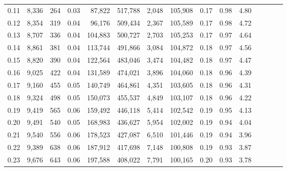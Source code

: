 \begin{tabular}{rrrcrrrrrrrrrrr}
0.11 &   8,336 &    264 &                                       0.03 &   87,822 &  517,788 &    2,048 &  105,908 &  0.17 &  0.98 &                         4.80 \\
0.12 &   8,354 &    319 &                                       0.04 &   96,176 &  509,434 &    2,367 &  105,589 &  0.17 &  0.98 &                         4.72 \\
0.13 &   8,707 &    336 &                                       0.04 &  104,883 &  500,727 &    2,703 &  105,253 &  0.17 &  0.97 &                         4.64 \\
0.14 &   8,861 &    381 &                                       0.04 &  113,744 &  491,866 &    3,084 &  104,872 &  0.18 &  0.97 &                         4.56 \\
0.15 &   8,820 &    390 &                                       0.04 &  122,564 &  483,046 &    3,474 &  104,482 &  0.18 &  0.97 &                         4.47 \\
0.16 &   9,025 &    422 &                                       0.04 &  131,589 &  474,021 &    3,896 &  104,060 &  0.18 &  0.96 &                         4.39 \\
0.17 &   9,160 &    455 &                                       0.05 &  140,749 &  464,861 &    4,351 &  103,605 &  0.18 &  0.96 &                         4.31 \\
0.18 &   9,324 &    498 &                                       0.05 &  150,073 &  455,537 &    4,849 &  103,107 &  0.18 &  0.96 &                         4.22 \\
0.19 &   9,419 &    565 &                                       0.06 &  159,492 &  446,118 &    5,414 &  102,542 &  0.19 &  0.95 &                         4.13 \\
0.20 &   9,491 &    540 &                                       0.05 &  168,983 &  436,627 &    5,954 &  102,002 &  0.19 &  0.94 &                         4.04 \\
0.21 &   9,540 &    556 &                                       0.06 &  178,523 &  427,087 &    6,510 &  101,446 &  0.19 &  0.94 &                         3.96 \\
0.22 &   9,389 &    638 &                                       0.06 &  187,912 &  417,698 &    7,148 &  100,808 &  0.19 &  0.93 &                         3.87 \\
0.23 &   9,676 &    643 &                                       0.06 &  197,588 &  408,022 &    7,791 &  100,165 &  0.20 &  0.93 &                         3.78 \\

\end{tabular}
